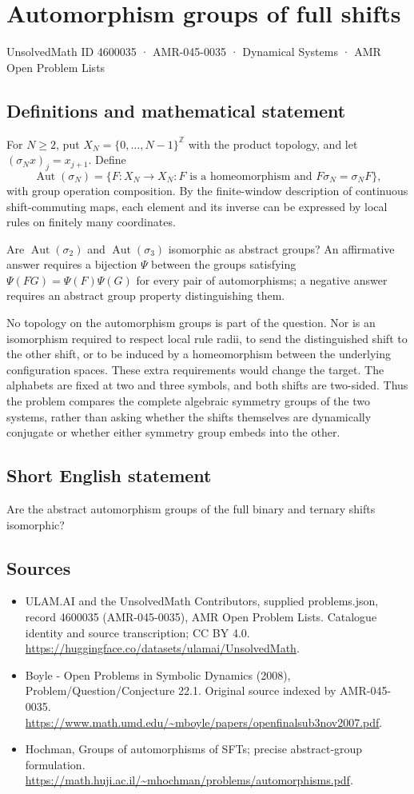 \documentclass[11pt,a4paper]{article}
\begin{document}
\section*{Automorphism groups of full shifts}\label{4600035}
{\small UnsolvedMath ID 4600035 · AMR-045-0035 · Dynamical Systems · AMR Open Problem Lists}
\subsection{Definitions and mathematical statement}
For $N\ge2$, put $X_N=\{0,\ldots,N-1\}^{\mathbb Z}$ with the
product topology, and let $(\sigma_Nx)_j=x_{j+1}$. Define
\[
 \operatorname{Aut}(\sigma_N)=
 \{F:X_N\to X_N:F\text{ is a homeomorphism and }
                         F\sigma_N=\sigma_NF\},
\]
with group operation composition. By the finite-window description
of continuous shift-commuting maps, each element and its inverse
can be expressed by local rules on finitely many coordinates.

Are $\operatorname{Aut}(\sigma_2)$ and
$\operatorname{Aut}(\sigma_3)$ isomorphic as abstract groups?
An affirmative answer requires a bijection $\Psi$ between the
groups satisfying $\Psi(FG)=\Psi(F)\Psi(G)$ for every pair of
automorphisms; a negative answer requires an abstract group
property distinguishing them.

No topology on the automorphism groups is part of the question.
Nor is an isomorphism required to respect local rule radii, to
send the distinguished shift to the other shift, or to be induced
by a homeomorphism between the underlying configuration spaces.
These extra requirements would change the target. The alphabets
are fixed at two and three symbols, and both shifts are two-sided.
Thus the problem compares the complete algebraic symmetry groups
of the two systems, rather than asking whether the shifts
themselves are dynamically conjugate or whether either symmetry
group embeds into the other.
\subsection{Short English statement}
Are the abstract automorphism groups of the full binary and ternary shifts isomorphic?
\subsection{Sources}
\begin{itemize}
\item[S1] ULAM.AI and the UnsolvedMath Contributors, supplied problems.json, record 4600035 (AMR-045-0035), AMR Open Problem Lists. Catalogue identity and source transcription; CC BY 4.0.
\url{https://huggingface.co/datasets/ulamai/UnsolvedMath}.
\item[S2] Boyle - Open Problems in Symbolic Dynamics (2008), Problem/Question/Conjecture 22.1. Original source indexed by AMR-045-0035.
\url{https://www.math.umd.edu/~mboyle/papers/openfinalsub3nov2007.pdf}.
\item[S3] Hochman, Groups of automorphisms of SFTs; precise abstract-group formulation.
\url{https://math.huji.ac.il/~mhochman/problems/automorphisms.pdf}.
\end{itemize}
\end{document}
